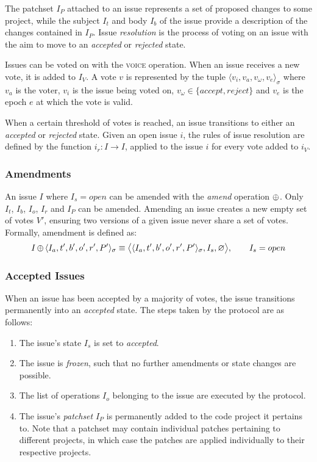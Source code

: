 The patchset $I_P$ attached to an issue represents a set of proposed changes to
some project, while the subject $I_t$ and body $I_b$ of the issue provide a
description of the changes contained in $I_P$. Issue \emph{resolution} is the
process of voting on an issue with the aim to move to an \emph{accepted} or
\emph{rejected} state.

Issues can be voted on with the \textsc{voice} operation. When an issue receives
a new vote, it is added to $I_V$. A vote $v$ is represented by the tuple
$\langle v_i, v_a, v_{\omega}, v_e \rangle_{\sigma}$ where $v_a$ is the voter,
$v_i$ is the issue being voted on, $v_{\omega} \in \{accept, reject\}$ and
$v_e$ is the epoch $e$ at which the vote is valid.

When a certain threshold of votes is reached, an issue transitions to either an
\emph{accepted} or \emph{rejected} state. Given an open issue $i$, the rules of
issue resolution are defined by the function $i_r : I \to I$, applied to the
issue $i$ for every vote added to $i_V$.

\subsubsection{Amendments}

An issue $I$ where $I_s = open$ can be amended with the \emph{amend} operation
$\operatorname{\oplus}$. Only $I_t$, $I_b$, $I_o$, $I_r$ and $I_P$ can be amended.  Amending an issue creates
a new empty set of votes $V'$, ensuring two versions of a given issue never
share a set of votes. Formally, amendment is defined as:
\begin{align*}
    I \operatorname{\oplus}{} \langle I_a, t', b', o', r', P' \rangle_{\sigma} \equiv
    \big<\langle I_a, t', b', o', r', P' \rangle_{\sigma}, I_s, \varnothing
    \big>, \qquad I_s = open
\end{align*}


\subsubsection{Accepted Issues} When an issue has been accepted by a majority
of votes, the issue transitions permanently into an \emph{accepted} state. The
steps taken by the protocol are as follows:

\begin{enumerate}
    \item The issue's state $I_s$ is set to \emph{accepted}.
    \item The issue is \emph{frozen}, such that no further amendments or state
        changes are possible.
    \item The list of operations $I_o$ belonging to the issue are executed by
        the protocol.
    \item The issue's \emph{patchset} $I_P$ is permanently added to the code
        project it pertains to. Note that a patchset may contain individual
        patches pertaining to different projects, in which case the patches are
        applied individually to their respective projects.
\end{enumerate}

